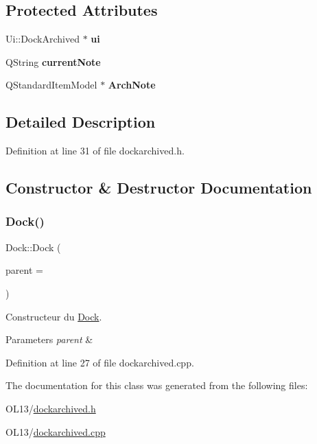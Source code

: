 \subsection*{Protected Attributes}
\begin{DoxyCompactItemize}
\item 
\mbox{\label{class_dock_a525f557d9a2670640105da2f1e605026}} 
Ui\+::\+Dock\+Archived $\ast$ {\bfseries ui}
\item 
\mbox{\label{class_dock_a6af86621e3df52266a582e464324e6d2}} 
Q\+String {\bfseries current\+Note}
\item 
\mbox{\label{class_dock_a484517393b214e1c3abe0c7b36596172}} 
Q\+Standard\+Item\+Model $\ast$ {\bfseries Arch\+Note}
\end{DoxyCompactItemize}


\subsection{Detailed Description}


Definition at line 31 of file dockarchived.\+h.



\subsection{Constructor \& Destructor Documentation}
\mbox{\label{class_dock_a1e81e2926e94969514ac45a9d839731c}} 
\subsubsection{\texorpdfstring{Dock()}{Dock()}}
{\footnotesize\ttfamily Dock\+::\+Dock (\begin{DoxyParamCaption}\item[{Q\+Widget $\ast$}]{parent = {} }\end{DoxyParamCaption})\hspace{0.3cm}{\ttfamily [explicit]}}



Constructeur du \hyperlink{class_dock}{Dock}. 


\begin{DoxyParams}{Parameters}
{\em parent} & \\
\hline
\end{DoxyParams}


Definition at line 27 of file dockarchived.\+cpp.



The documentation for this class was generated from the following files\+:\begin{DoxyCompactItemize}
\item 
O\+L13/\hyperlink{dockarchived_8h}{dockarchived.\+h}\item 
O\+L13/\hyperlink{dockarchived_8cpp}{dockarchived.\+cpp}\end{DoxyCompactItemize}
